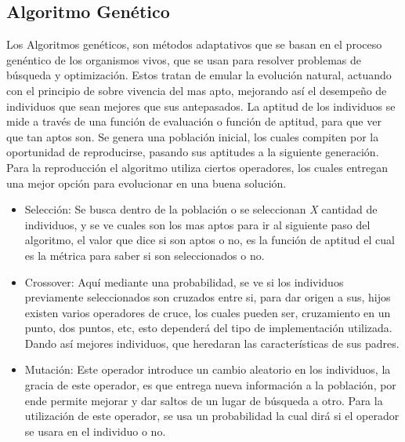 \documentclass[letter, 10pt]{article}
\begin{document}
\subsection{Algoritmo Gen\'etico}
Los Algoritmos gen\'eticos, son m\'etodos adaptativos que se basan en el proceso gen\'entico de los organismos vivos, que se usan para resolver 
problemas de b\'usqueda y optimizaci\'on. Estos tratan de emular la evoluci\'on natural, actuando con el principio de sobre vivencia del mas apto, 
mejorando as\'i el desempe\~no de individuos que sean mejores que sus antepasados. La aptitud de los individuos se mide a trav\'es de una funci\'on de
evaluaci\'on o funci\'on de aptitud, para que ver que tan aptos son. Se genera una poblaci\'on inicial, los cuales compiten por la oportunidad de
reproducirse, pasando sus aptitudes a la siguiente generaci\'on. Para la reproducci\'on el algoritmo utiliza ciertos operadores, los cuales entregan 
una mejor opci\'on para evolucionar en una buena soluci\'on.
\begin{itemize}
 \item Selecci\'on: Se busca dentro de la poblaci\'on o se seleccionan \emph{X} cantidad de individuos, y se ve cuales son los mas aptos para ir al 
 siguiente paso del algoritmo, el valor que dice si son aptos o no, es la funci\'on de aptitud el cual es la m\'etrica para saber si 
 son seleccionados o no.
 \item Crossover: Aqu\'i mediante una probabilidad, se ve si los individuos previamente seleccionados son cruzados entre si, para dar origen a sus,
 hijos existen varios operadores de cruce, los cuales pueden ser, cruzamiento en un punto, dos puntos, etc, esto depender\'a del 
 tipo de implementaci\'on utilizada. Dando as\'i mejores individuos, que heredaran las caracter\'isticas de sus padres.
 \item Mutaci\'on: Este operador introduce un cambio aleatorio en los individuos, la gracia de este operador, es que entrega nueva informaci\'on a la 
 poblaci\'on, por ende permite mejorar y dar saltos de un lugar de b\'usqueda a otro. Para la utilizaci\'on de este operador, se usa un probabilidad 
 la cual dir\'a si el operador se usara en el individuo o no.
\end{itemize}
\end{document}
